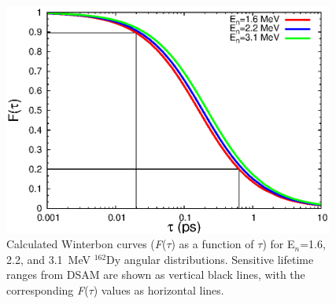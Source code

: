\begin{figure}[ht]
\begin{center}
\includegraphics[width=0.97\textwidth]{figures/ftau_all.eps}
\caption{Calculated Winterbon curves (\textit{F}(\textit{$\tau$}) as a function of \textit{$\tau$}) for E$_n$=1.6, 2.2, and 3.1~MeV $^{162}$Dy angular distributions. Sensitive lifetime ranges from DSAM are shown as vertical black lines, with the corresponding \textit{F}(\textit{$\tau$}) values as horizontal lines.
\label{fig:ftau_all}}
\end{center}
\end{figure}

